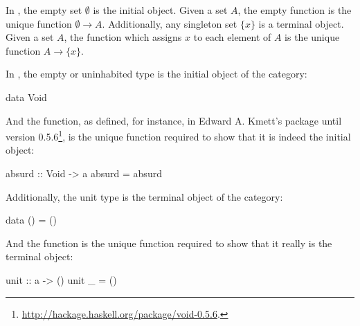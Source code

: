 \begin{example}
  \label{ex:initial-terminal-objects-set}


  In \set, the empty set $\emptyset$ is the initial object. Given a
  set $A$, the empty function is the unique function $\emptyset \to
  A$. Additionally, any singleton set $\{x\}$ is a terminal object.
  Given a set $A$, the function which assigns $x$ to each element of
  $A$ is the unique function $A \to \{x\}$.

\end{example}

\begin{example}
  \label{ex:initial-terminal-objects-haskell}

  In \hask, the empty or uninhabited type is the initial object of the
  category:
  \begin{codehaskell}
data Void
  \end{codehaskell}
  And the  function, as defined, for instance, in
  Edward A. Kmett's  package until version
  0.5.6\footnote{\url{http://hackage.haskell.org/package/void-0.5.6}.},
  is the unique function required to show that it is indeed the
  initial object:
  \begin{codehaskell}
absurd :: Void -> a
absurd = absurd
  \end{codehaskell}
  Additionally, the unit type is the terminal object of the category:
  \begin{codehaskell}
data () = ()
  \end{codehaskell}
  And the  function is the unique function required
  to show that it really is the terminal object:
  \begin{codehaskell}
unit :: a -> ()
unit _ = ()
  \end{codehaskell}

\end{example}

